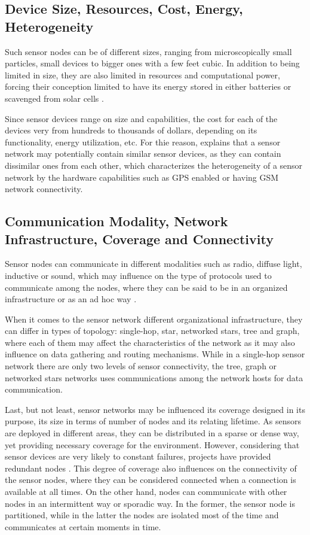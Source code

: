 \subsection{Device Size, Resources, Cost, Energy, Heterogeneity}

Such sensor nodes can be of different sizes, ranging from microscopically small
particles, small devices to bigger ones with a few feet cubic. In addition to
being limited in size, they are also limited in resources and computational
power, forcing their conception limited to have its energy stored in either
batteries or scavenged from solar cells \cite{sn-intro01}.

Since sensor devices range on size and capabilities, the cost for each of the
devices very from hundreds to thousands of dollars, depending on its
functionality, energy utilization, etc. For thie reason, \cite{sn-intro01}
explains that a sensor network may potentially contain similar sensor devices,
as they can contain dissimilar ones from each other, which characterizes the heterogeneity 
of a sensor network by the hardware capabilities such as GPS enabled or having
GSM  network connectivity.

\subsection{Communication Modality, Network Infrastructure, Coverage and
Connectivity}
\label{sec:sn-infrastructure}

Sensor nodes can communicate in different modalities such as radio, diffuse
light, inductive or sound, which may influence on the type of protocols used to
communicate among the nodes, where they can be said to be in an organized
infrastructure or as an ad hoc way \cite{sn-intro01}.

When it comes to the sensor network different organizational infrastructure,
they can differ in types of topology: single-hop, star, networked stars, tree
and graph, where each of them may affect the characteristics of the network as it 
may also influence on data gathering and routing mechanisms. While in a
single-hop sensor network there are only two levels of sensor connectivity, the
tree, graph or networked stars networks uses communications among the network
hosts for data communication.

Last, but not least, sensor networks may be influenced its coverage designed in
its purpose, its size in terms of number of nodes and its relating lifetime. As
sensors are deployed in different areas, they can be distributed in a sparse or
dense way, yet providing necessary coverage for the environment. However, 
considering that sensor devices are very likely to constant failures, projects 
have provided redundant nodes \cite{sn-intro01}. This degree of coverage also 
influences on the connectivity of the sensor nodes, where they can be
considered connected when a connection is available at all times. On the other
hand, nodes can communicate with other nodes in an intermittent way or sporadic
way. In the former, the sensor node is partitioned, while in the latter the
nodes are isolated most of the time and communicates at certain moments in
time.


